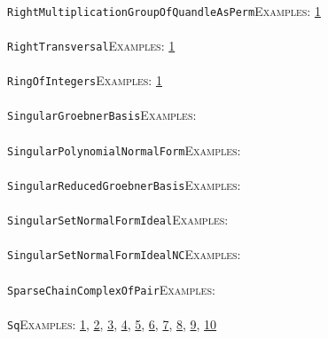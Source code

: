 \documentclass[a4paper,11pt]{report}
\begin{document}
{{ \\
 \texttt{RightMultiplicationGroupOfQuandleAsPerm}{\nobreakspace}{\nobreakspace}{\nobreakspace}{\nobreakspace}\textsc{Examples:} \href{../www/SideLinks/About/aboutQuandles.html} {1}{\nobreakspace} \\
 \\
 \texttt{RightTransversal}{\nobreakspace}{\nobreakspace}{\nobreakspace}{\nobreakspace}\textsc{Examples:} \href{tutorial/chap10.html} {1}{\nobreakspace} \\
 \\
 \texttt{RingOfIntegers}{\nobreakspace}{\nobreakspace}{\nobreakspace}{\nobreakspace}\textsc{Examples:} \href{tutorial/chap10.html} {1}{\nobreakspace} \\
 \\
 \texttt{SingularGroebnerBasis}{\nobreakspace}{\nobreakspace}{\nobreakspace}{\nobreakspace}\textsc{Examples:} \\
 \\
 \texttt{SingularPolynomialNormalForm}{\nobreakspace}{\nobreakspace}{\nobreakspace}{\nobreakspace}\textsc{Examples:} \\
 \\
 \texttt{SingularReducedGroebnerBasis}{\nobreakspace}{\nobreakspace}{\nobreakspace}{\nobreakspace}\textsc{Examples:} \\
 \\
 \texttt{SingularSetNormalFormIdeal}{\nobreakspace}{\nobreakspace}{\nobreakspace}{\nobreakspace}\textsc{Examples:} \\
 \\
 \texttt{SingularSetNormalFormIdealNC}{\nobreakspace}{\nobreakspace}{\nobreakspace}{\nobreakspace}\textsc{Examples:} \\
 \\
 \texttt{SparseChainComplexOfPair}{\nobreakspace}{\nobreakspace}{\nobreakspace}{\nobreakspace}\textsc{Examples:} \\
 \\
 \texttt{Sq}{\nobreakspace}{\nobreakspace}{\nobreakspace}{\nobreakspace}\textsc{Examples:} \href{tutorial/chap7.html} {1}{\nobreakspace}, \href{tutorial/chap10.html} {2}{\nobreakspace}, \href{../www/SideLinks/About/aboutArtinGroups.html} {3}{\nobreakspace}, \href{../www/SideLinks/About/aboutModPRings.html} {4}{\nobreakspace}, \href{../www/SideLinks/About/aboutAspherical.html} {5}{\nobreakspace}, \href{../www/SideLinks/About/aboutNonabelian.html} {6}{\nobreakspace}, \href{../www/SideLinks/About/aboutQuandles2.html} {7}{\nobreakspace}, \href{../www/SideLinks/About/aboutKnots.html} {8}{\nobreakspace}, \href{../www/SideLinks/About/aboutTensorSquare.html} {9}{\nobreakspace}, \href{../www/SideLinks/About/aboutKnotsQuandles.html} {10}{\nobreakspace} \\
}}
\end{document}
